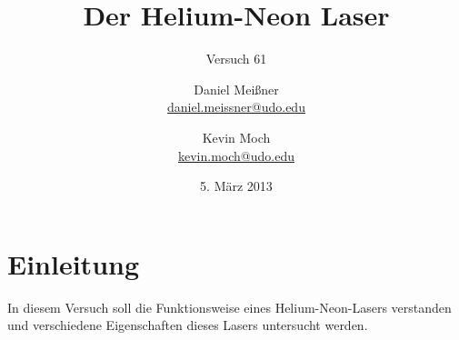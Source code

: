 

\newcommand{\name}[1]{\textsc{#1}}
\renewcommand{\d}{\ensuremath{\mathrm{d}}}

\titlehead{{TU Dortmund \hfill WS~13/14\\}
Fakultät Physik\\
Fortgeschrittenenpraktikum}

\subject{Versuchsprotokoll}
\title{Der Helium-Neon Laser}
\subtitle{Versuch 61}

\author{Daniel Meißner\\
{\normalsize\url{daniel.meissner@udo.edu}}
\and
Kevin Moch\\
{\normalsize\url{kevin.moch@udo.edu}}}

\date{5. März 2013}


\maketitle

\tableofcontents
\clearpage

\section{Einleitung}
In diesem Versuch soll die Funktionsweise eines Helium-Neon-Lasers
verstanden und verschiedene Eigenschaften dieses Lasers untersucht
werden.






\printbibliography
\nocite{v061}


